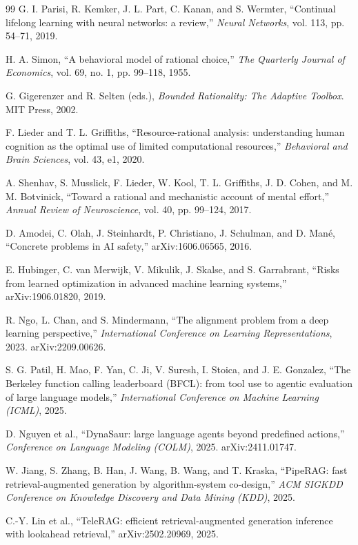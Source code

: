\documentclass[10pt,a4paper,twocolumn,aps,prl]{revtex4-2}
\begin{document}
\begin{thebibliography}{99}
G. I. Parisi, R. Kemker, J. L. Part, C. Kanan, and S. Wermter, ``Continual lifelong learning with neural networks: a review,'' \emph{Neural Networks}, vol. 113, pp. 54--71, 2019.

H. A. Simon, ``A behavioral model of rational choice,'' \emph{The Quarterly Journal of Economics}, vol. 69, no. 1, pp. 99--118, 1955.

G. Gigerenzer and R. Selten (eds.), \emph{Bounded Rationality: The Adaptive Toolbox}. MIT Press, 2002.

F. Lieder and T. L. Griffiths, ``Resource-rational analysis: understanding human cognition as the optimal use of limited computational resources,'' \emph{Behavioral and Brain Sciences}, vol. 43, e1, 2020.

A. Shenhav, S. Musslick, F. Lieder, W. Kool, T. L. Griffiths, J. D. Cohen, and M. M. Botvinick, ``Toward a rational and mechanistic account of mental effort,'' \emph{Annual Review of Neuroscience}, vol. 40, pp. 99--124, 2017.

D. Amodei, C. Olah, J. Steinhardt, P. Christiano, J. Schulman, and D. Man\'{e}, ``Concrete problems in AI safety,'' arXiv:1606.06565, 2016.

E. Hubinger, C. van Merwijk, V. Mikulik, J. Skalse, and S. Garrabrant, ``Risks from learned optimization in advanced machine learning systems,'' arXiv:1906.01820, 2019.

R. Ngo, L. Chan, and S. Mindermann, ``The alignment problem from a deep learning perspective,'' \emph{International Conference on Learning Representations}, 2023. arXiv:2209.00626.

S. G. Patil, H. Mao, F. Yan, C. Ji, V. Suresh, I. Stoica, and J. E. Gonzalez, ``The Berkeley function calling leaderboard (BFCL): from tool use to agentic evaluation of large language models,'' \emph{International Conference on Machine Learning (ICML)}, 2025.

D. Nguyen et al., ``DynaSaur: large language agents beyond predefined actions,'' \emph{Conference on Language Modeling (COLM)}, 2025. arXiv:2411.01747.

W. Jiang, S. Zhang, B. Han, J. Wang, B. Wang, and T. Kraska, ``PipeRAG: fast retrieval-augmented generation by algorithm-system co-design,'' \emph{ACM SIGKDD Conference on Knowledge Discovery and Data Mining (KDD)}, 2025.

C.-Y. Lin et al., ``TeleRAG: efficient retrieval-augmented generation inference with lookahead retrieval,'' arXiv:2502.20969, 2025.

\end{thebibliography}
\end{document}
